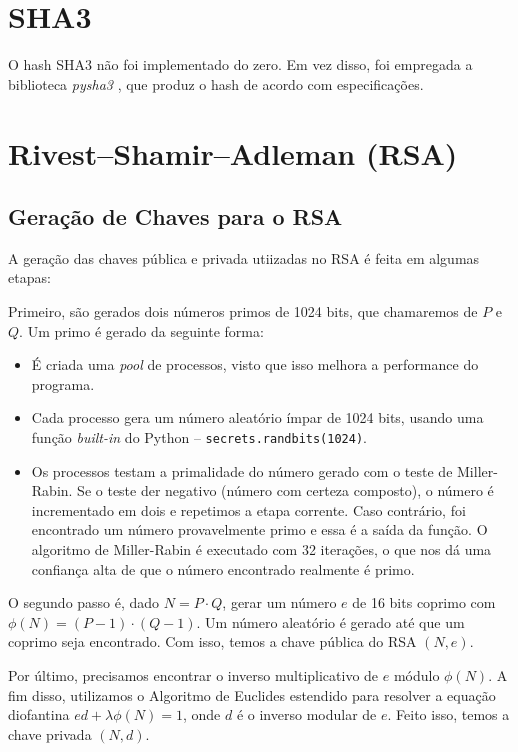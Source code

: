 \documentclass[a4paper, 10.5pt]{article}
\begin{document}

\section{SHA3} %
\label{sec:sha3}
O hash SHA3 não foi implementado do zero. Em vez disso, foi empregada a biblioteca
\textit{pysha3} \citep{pysha3}, que produz o hash de acordo com especificações.

\section{Rivest–Shamir–Adleman (RSA)} %

\subsection{Geração de Chaves para o RSA} %
A geração das chaves pública e privada utiizadas no RSA é feita em algumas etapas:

Primeiro, são gerados dois números primos de 1024 bits, que chamaremos de $P$ e
$Q$. Um primo é gerado da seguinte forma:

\begin{itemize}
    \item É criada uma \textit{pool} de processos, visto que isso melhora a
        performance do programa.
    \item Cada processo gera um número aleatório ímpar de 1024 bits, usando uma função
        \textit{built-in} do Python -- \verb|secrets.randbits(1024)|.
    \item Os processos testam a primalidade do número gerado com o teste de
        Miller-Rabin. Se o teste der negativo (número com certeza composto), o
        número é incrementado em dois e repetimos a etapa corrente. Caso
        contrário, foi encontrado um número provavelmente primo e essa é a saída
        da função. O algoritmo de Miller-Rabin é executado com 32 iterações, o
        que nos dá uma confiança alta de que o número encontrado realmente é
        primo.
\end{itemize}

O segundo passo é, dado $N = P \cdot Q$, gerar um número $e$ de 16 bits
coprimo com $ \phi(N) = (P-1) \cdot (Q-1) $. Um número aleatório é gerado até que um coprimo seja
encontrado. Com isso, temos a chave pública do RSA $(N, e)$.  

Por último, precisamos encontrar o inverso multiplicativo de $e$ módulo
$\phi(N)$. A fim disso, utilizamos o Algoritmo de Euclides estendido para
resolver a equação diofantina $ed + \lambda \phi(N) = 1$, onde $d$ é o
inverso modular de $e$. Feito isso, temos a chave privada $(N, d)$.
\end{document}
